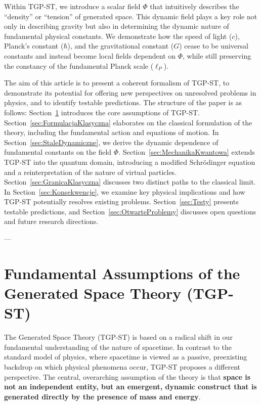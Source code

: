 \documentclass[11pt,a4paper]{article}
\begin{document}
Within TGP-ST, we introduce a scalar field $\Phi$ that intuitively describes the “density” or “tension” of generated space. This dynamic field plays a key role not only in describing gravity but also in determining the dynamic nature of fundamental physical constants. We demonstrate how the speed of light ($c$), Planck’s constant ($\hbar$), and the gravitational constant ($G$) cease to be universal constants and instead become local fields dependent on $\Phi$, while still preserving the constancy of the fundamental Planck scale ($\ell_P$).

The aim of this article is to present a coherent formalism of TGP-ST, to demonstrate its potential for offering new perspectives on unresolved problems in physics, and to identify testable predictions. The structure of the paper is as follows: Section~\ref{sec:Zalozenia} introduces the core assumptions of TGP-ST. Section~\ref{sec:FormulacjaKlasyczna} elaborates on the classical formulation of the theory, including the fundamental action and equations of motion. In Section~\ref{sec:StaleDynamiczne}, we derive the dynamic dependence of fundamental constants on the field $\Phi$. Section~\ref{sec:MechanikaKwantowa} extends TGP-ST into the quantum domain, introducing a modified Schrödinger equation and a reinterpretation of the nature of virtual particles. Section~\ref{sec:GranicaKlasyczna} discusses two distinct paths to the classical limit. In Section~\ref{sec:Konsekwencje}, we examine key physical implications and how TGP-ST potentially resolves existing problems. Section~\ref{sec:Testy} presents testable predictions, and Section~\ref{sec:OtwarteProblemy} discusses open questions and future research directions.

---

\section{Fundamental Assumptions of the Generated Space Theory (TGP-ST)}
\label{sec:Zalozenia}

The Generated Space Theory (TGP-ST) is based on a radical shift in our fundamental understanding of the nature of spacetime. In contrast to the standard model of physics, where spacetime is viewed as a passive, preexisting backdrop on which physical phenomena occur, TGP-ST proposes a different perspective. The central, overarching assumption of the theory is that \textbf{space is not an independent entity, but an emergent, dynamic construct that is generated directly by the presence of mass and energy}.
\end{document}
